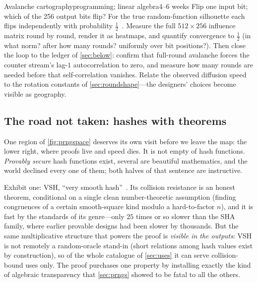 \begin{project}{Avalanche cartography}{programming; linear
  algebra}{4--6 weeks}
  Flip one input bit; which of the 256 output bits flip? For the true
  random-function silhouette each flips independently with probability
  $\tfrac12$~\citep{WebsterTavares1985}. Measure the full $512 \times 256$
  influence matrix round by round, render it as heatmaps, and quantify
  convergence to $\tfrac12$ (in what norm? after how many rounds?
  uniformly over bit positions?). Then close the loop to the ledger of
  \cref{sec:below}: confirm that full-round avalanche forces the counter
  stream's lag-$1$ autocorrelation to zero, and measure how many rounds
  are needed before that self-correlation vanishes. Relate the observed
  diffusion speed to the rotation constants of
  \cref{sec:roundshape}---the designers' choices become visible as
  geography.
\end{project}

\subsection{The road not taken: hashes with theorems}\label{sec:provable}

One region of \cref{fig:prngspace} deserves its own visit before we
leave the map: the lower right, where proofs live and speed dies. It is
not empty of hash functions. \emph{Provably secure} hash functions
exist, several are beautiful mathematics, and the world declined every
one of them; both halves of that sentence are instructive.

Exhibit one: VSH, ``very smooth hash''~\citep{ContiniLenstraSteinfeld2006}.
Its collision resistance is an honest theorem, conditional on a single
clean number-theoretic assumption (finding congruences of a certain
smooth-square kind modulo a hard-to-factor $n$), and it is fast by the
standards of its genre---only $25$ times or so slower than the SHA
family, where earlier provable designs had been slower by thousands.
But the same multiplicative structure that powers the proof is
\emph{visible in the outputs}: VSH is not remotely a random-oracle
stand-in (short relations among hash values exist by construction), so
of the whole catalogue of \cref{sec:uses} it can serve collision-bound
uses only. The proof purchases one property by installing exactly the
kind of algebraic transparency that \cref{sec:prngs} showed to be fatal
to all the others.


